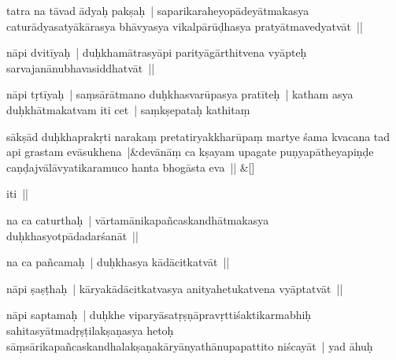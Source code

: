 \documentclass[article,12pt,a4paper]{memoir}%
\newcounter{parCount}
\begin{document}
	  \pstart \leavevmode%
	\label{thakur75-2.7}tatra na tāvad ādyaḥ pakṣaḥ | saparikaraheyopādeyātmakasya caturādyasatyākārasya bhāvyasya vikalpārūḍhasya pratyātmavedyatvāt || 
	{}
	\pend%
      

	  \pstart \leavevmode%
	\label{thakur75-2.9} nāpi dvitīyaḥ | duḥkhamātrasyāpi parityāgārthitvena vyāpteḥ sarvajanānubhavasiddhatvāt ||
	{}
	\pend%
      

	  \pstart \leavevmode%
	\label{thakur75-2.11}nāpi tṛtīyaḥ | saṃsārātmano duḥkhasvarūpasya pratīteḥ | katham asya duḥkhātmakatvam iti cet | saṃkṣepataḥ kathitaṃ 
	{}
	\pend%
      
	    
	    \stanza[\smallbreak]
	  sākṣād duḥkhaprakṛti narakaṃ pretatiryakkharūpaṃ martye śama kvacana tad api grastam evāsukhena |&devānāṃ ca kṣayam upagate puṇyapātheyapiṇḍe caṇḍajvālāvyatikaramuco hanta bhogāsta eva || \&[\smallbreak]
	  
	  
	  

	  \pstart \leavevmode%
	iti || 
	{}
	\pend%
      

	  \pstart \leavevmode%
	\label{thakur75-2.17}na ca caturthaḥ | vārtamānikapañcaskandhātmakasya duḥkhasyotpādadarśanāt || 
	{}
	\pend%
      

	  \pstart \leavevmode%
	\label{thakur75-2.18}na ca pañcamaḥ | duḥkhasya kādācitkatvāt || 
	{}
	\pend%
      

	  \pstart \leavevmode%
	\label{thakur75-2.19}nāpi ṣaṣṭhaḥ | kāryakādācitkatvasya anityahetukatvena vyāptatvāt || 
	{}
	\pend%
      

	  \pstart \leavevmode%
	\label{thakur75-2.20}nāpi saptamaḥ | duḥkhe viparyāsatṛṣṇāpravṛttiśaktikarmabhiḥ sahitasyātmadṛṣṭilakṣaṇasya hetoḥ sāṃsārikapañcaskandhalakṣaṇakāryānyathānupapattito niścayāt | yad āhuḥ 
	{}
	\pend%
      
\end{document}
